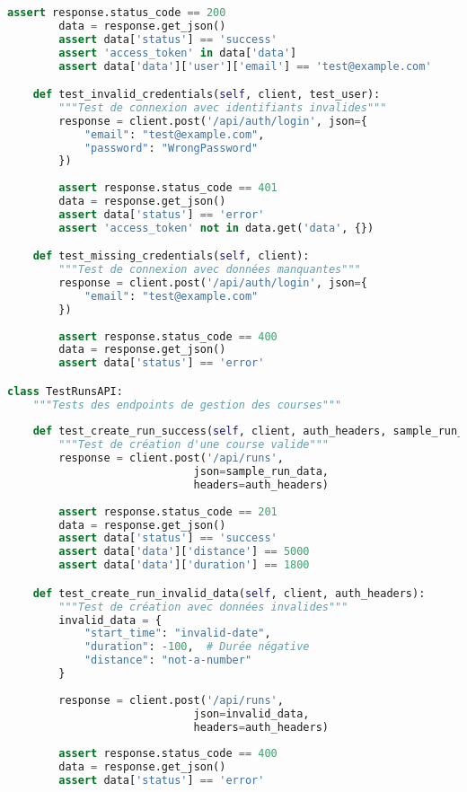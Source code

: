 \begin{lstlisting}[language=python, caption=Suite de tests API complète]
        assert response.status_code == 200
        data = response.get_json()
        assert data['status'] == 'success'
        assert 'access_token' in data['data']
        assert data['data']['user']['email'] == 'test@example.com'

    def test_invalid_credentials(self, client, test_user):
        """Test de connexion avec identifiants invalides"""
        response = client.post('/api/auth/login', json={
            "email": "test@example.com",
            "password": "WrongPassword"
        })
        
        assert response.status_code == 401
        data = response.get_json()
        assert data['status'] == 'error'
        assert 'access_token' not in data.get('data', {})

    def test_missing_credentials(self, client):
        """Test de connexion avec données manquantes"""
        response = client.post('/api/auth/login', json={
            "email": "test@example.com"
        })
        
        assert response.status_code == 400
        data = response.get_json()
        assert data['status'] == 'error'

class TestRunsAPI:
    """Tests des endpoints de gestion des courses"""
    
    def test_create_run_success(self, client, auth_headers, sample_run_data):
        """Test de création d'une course valide"""
        response = client.post('/api/runs', 
                             json=sample_run_data, 
                             headers=auth_headers)
        
        assert response.status_code == 201
        data = response.get_json()
        assert data['status'] == 'success'
        assert data['data']['distance'] == 5000
        assert data['data']['duration'] == 1800

    def test_create_run_invalid_data(self, client, auth_headers):
        """Test de création avec données invalides"""
        invalid_data = {
            "start_time": "invalid-date",
            "duration": -100,  # Durée négative
            "distance": "not-a-number"
        }
        
        response = client.post('/api/runs', 
                             json=invalid_data, 
                             headers=auth_headers)
        
        assert response.status_code == 400
        data = response.get_json()
        assert data['status'] == 'error'


\end{lstlisting}

